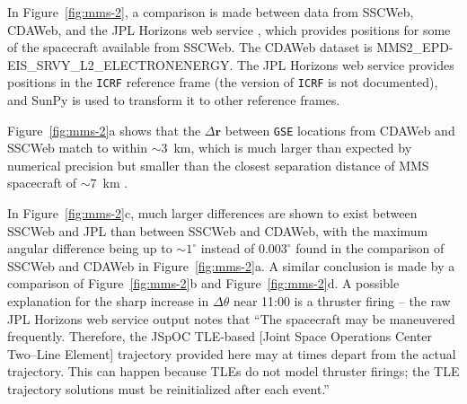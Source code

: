 \documentclass[draft]{agujournal2019}
\begin{document}



In Figure~\ref{fig:mms-2}, a comparison is made between data from SSCWeb, CDAWeb, and the JPL Horizons web service \cite{JPLHorizons}, which provides positions for some of the spacecraft available from SSCWeb. The CDAWeb dataset is MMS2\_EPD-EIS\_SRVY\_L2\linebreak\_ELECTRONENERGY. The JPL Horizons web service provides positions in the \texttt{ICRF} reference frame (the version of \texttt{ICRF} is not documented), and SunPy is used to transform it to other reference frames.

Figure~\ref{fig:mms-2}a shows that the $\Delta \mathbf{r}$ between \texttt{GSE} locations from CDAWeb and SSCWeb match to within ${\sim}3$~km, which is much larger than expected by numerical precision but smaller than the closest separation distance of MMS spacecraft of ${\sim}7$~km \cite{NASA2016}.

In Figure~\ref{fig:mms-2}c, much larger differences are shown to exist between SSCWeb and JPL than between SSCWeb and CDAWeb, with the maximum angular difference being up to ${\sim}1^\circ$ instead of $0.003^\circ$ found in the comparison of SSCWeb and CDAWeb in Figure~\ref{fig:mms-2}a. A similar conclusion is made by a comparison of Figure~\ref{fig:mms-2}b and Figure~\ref{fig:mms-2}d. A possible explanation for the sharp increase in $\Delta \theta$ near 11:00 is a thruster firing  -- the raw JPL Horizons web service output notes that ``The spacecraft may be maneuvered frequently. Therefore, the JSpOC TLE-based [Joint Space Operations Center Two--Line Element] trajectory provided here may at times depart from the actual trajectory. This can happen because TLEs do not model thruster firings; the TLE trajectory solutions must be reinitialized after each event.''
\end{document}
